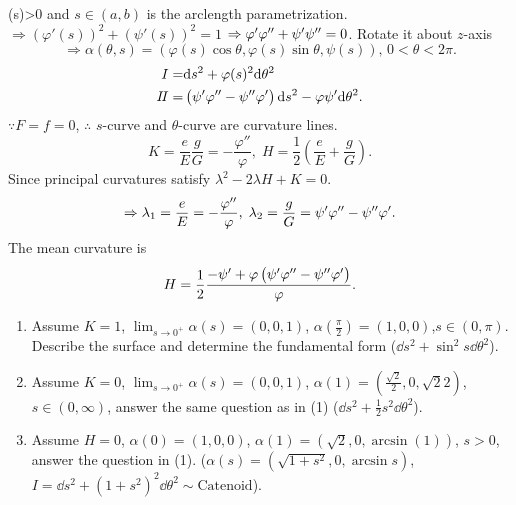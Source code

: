 (s)>0\) and \(s\in(a,b)\) is the arclength parametrization.
\(\Rightarrow \left(\varphi'(s)\right)^2+\left(\psi'(s)\right)^2=1\)
\(\Rightarrow \varphi'\varphi'' +\psi'\psi''=0\).
Rotate it about \(z\)-axis
\[
    \Rightarrow \alpha(\theta,s)=\left(\varphi(s)\cos\theta
    ,\varphi(s)\sin \theta,\psi(s)\right),\, 0<\theta<2\pi.
\]
\begin{align*}
    I=&\dd s^2+\varphi(s)^2\dd \theta^2\\
    I\!I=&\left(\psi'\varphi''-\psi''\varphi'\right)\dd s^2
    -\varphi\psi'\dd\theta^2.
\end{align*}
\(\because F=f=0\), \(\therefore\) \(s\)-curve and \(\theta\)-curve 
are curvature lines.
\[
    K=\frac{e}{E}\frac{g}{G}=-\frac{\varphi''}{\varphi},\;
    H=\frac{1}{2}\left(\frac{e}{E}+\frac{g}{G}\right)    .
\]
Since principal curvatures satisfy \(\lambda^2-2\lambda H+K=0\).
\[
    \Rightarrow \lambda_1    =\frac{e}{E}=-\frac{\varphi''}{\varphi},
    \;\lambda_2=\frac{g}{G}=\psi'\varphi''-\psi''\varphi'.
\]
The mean curvature is 
\[
    H=\frac{1}{2}\frac{-\psi'+\varphi\left(\psi'\varphi''-
    \psi''\varphi'\right)}{\varphi}.    
\]
\begin{question}[Homework]
    \begin{enumerate}[(1)]
        \item Assume \(K=1\), \(\lim_{s\to 0^+}\alpha(s)=(0,0,1)\),
         \(\alpha(\frac{\pi}{2})=(1,0,0)\),\(s\in (0,\pi)\). 
         Describe the surface and determine the 
         fundamental form (\(\dd s^2+\sin^2 s\dd \theta^2\)).
         \item Assume \(K=0\), \(\lim_{s\to 0^+}\alpha(s)=(0,0,1)\),
          \(\alpha(1)=(\frac{\sqrt{2}}{2},0,\sqrt{2}{2})\), 
          \(s\in (0,\infty)\), answer the same question as in (1)
          (\(\dd s^2+\frac{1}{2}s^2\dd \theta^2\)).
          \item Assume \(H=0\), \(\alpha(0)=(1,0,0)\), \(\alpha(1)
          =(\sqrt{2},0,\arcsin(1))\), \(s>0\), answer the question in 
          (1). (\(\alpha(s)=\left(\sqrt{1+s^2},0,\arcsin s\right)\),
           \(I=\dd s^2+(1+s^2)^2\dd \theta^2\sim \text{Catenoid}\)).
    \end{enumerate}
\end{question}

